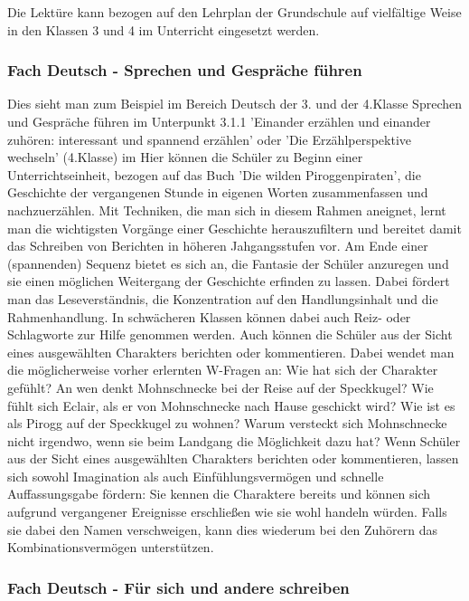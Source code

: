 Die Lektüre kann bezogen auf den Lehrplan der Grundschule \cite{Lehrplan der Grundschule, Bayern 2000} auf vielfältige Weise in den Klassen 3 und 4 im Unterricht eingesetzt werden. 

\subsubsection{Fach Deutsch - Sprechen und Gespräche führen}

Dies sieht man zum Beispiel im Bereich Deutsch der 3. und der 4.Klasse Sprechen und Gespräche führen im Unterpunkt 3.1.1 'Einander erzählen und einander zuhören: interessant und spannend erzählen' oder 'Die Erzählperspektive wechseln' (4.Klasse) im\cite{Lehrplan der Grundschule, Bayern 2000} 
Hier können die Schüler zu Beginn einer Unterrichtseinheit, bezogen auf das Buch 'Die wilden Piroggenpiraten',\cite{pir} die Geschichte der vergangenen Stunde in eigenen Worten zusammenfassen und nachzuerzählen. Mit Techniken, die man sich in diesem Rahmen aneignet, lernt man die wichtigsten Vorgänge einer Geschichte herauszufiltern und  bereitet damit das Schreiben von Berichten in höheren Jahgangsstufen vor. 
Am Ende einer (spannenden) Sequenz bietet es sich an, die Fantasie der Schüler anzuregen und sie einen möglichen Weitergang der Geschichte erfinden zu lassen. Dabei fördert man das Leseverständnis, die Konzentration auf den Handlungsinhalt und die Rahmenhandlung. In schwächeren Klassen können dabei auch Reiz- oder Schlagworte zur Hilfe genommen werden. 
Auch können die Schüler aus der Sicht eines ausgewählten Charakters berichten oder kommentieren. Dabei wendet man die möglicherweise vorher erlernten W-Fragen an: Wie hat sich der Charakter gefühlt? An wen denkt Mohnschnecke bei der Reise auf der Speckkugel? Wie fühlt sich Eclair, als er von Mohnschnecke nach Hause geschickt wird? Wie ist es als Pirogg auf der Speckkugel zu wohnen? Warum versteckt sich Mohnschnecke nicht irgendwo, wenn sie beim Landgang die Möglichkeit dazu hat?
Wenn Schüler aus der Sicht eines ausgewählten Charakters berichten oder kommentieren, lassen sich sowohl Imagination als auch Einfühlungsvermögen und schnelle Auffassungsgabe fördern: Sie kennen die Charaktere bereits und können sich aufgrund vergangener Ereignisse erschließen wie sie wohl handeln würden. Falls sie dabei den Namen verschweigen, kann dies wiederum bei den Zuhörern das Kombinationsvermögen unterstützen.

\subsubsection{Fach Deutsch - Für sich und andere schreiben}

